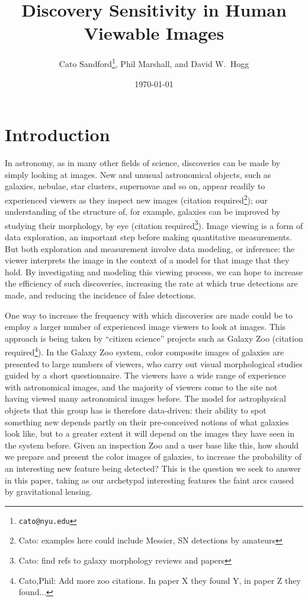 \documentclass[letterpaper, 11pt]{article}
\title{Discovery Sensitivity in Human Viewable Images}
\author{Cato Sandford\thanks{\texttt{cato@nyu.edu}},
        Phil Marshall,
    and David W.\ Hogg}
\date{\today}
\begin{document}
\maketitle


\section{Introduction}

In astronomy, as in many other fields of science, discoveries can be made by
simply looking at images. New and unusual astronomical objects, such as
galaxies, nebulae, star clusters, supernovae and so on, appear readily to
experienced viewers as they inspect new images (citation
required\footnote{Cato: examples here could include  Messier, SN detections by
amateurs}); our understanding of  the structure of, for example, galaxies can
be improved by studying their morphology, by eye (citation
required\footnote{Cato: find refs to galaxy morphology reviews and papers}).
Image viewing is a form of data exploration, an important step before making
quantitative measurements. But both exploration and measurement involve data
modeling, or inference: the viewer interprets the image in the context of a
model for that image that they hold.  By investigating and modeling this
viewing process, we can hope to increase the efficiency of such discoveries,
increasing the rate at which true detections are made, and reducing the
incidence of false detections. 

One way to increase the frequency with which discoveries are made  could be to
employ a larger number of experienced image viewers to look at images.  This
approach is being taken by ``citizen science'' projects such as Galaxy Zoo
(citation required\footnote{Cato,Phil: Add more zoo citations. In paper X they
found Y, in paper Z they found...}). In the Galaxy Zoo system, color composite
images of galaxies are presented to large numbers of viewers, who carry out
visual morphological studies guided by a short questionnaire. The viewers have
a wide range of experience with astronomical images, and the majority of
viewers come to the site not having viewed many astronomical images before.
The model for astrophysical objects that this group has is therefore
data-driven: their ability to spot something new depends partly on their
pre-conceived notions of what galaxies look like, but to a greater extent it
will depend on the images they have seen in the system before. Given an
inspection Zoo and a user base like this,  how should we prepare and present
the color images of galaxies, to increase the probability of an interesting
new feature being detected? This is the question we seek to answer in this
paper, taking as our archetypal interesting features the faint arcs caused by
gravitational lensing. 
\end{document}
